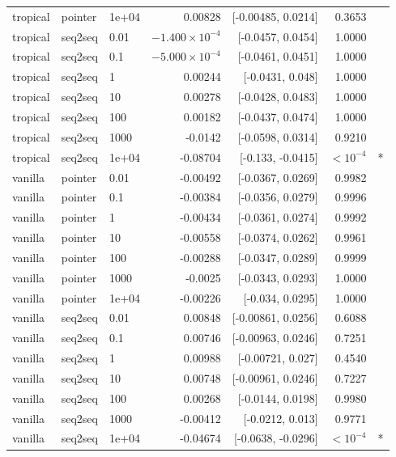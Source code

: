 \documentclass[10pt]{article}
\begin{document}
{\begin{longtable}{lllrrrl}
tropical & pointer & 1e+04 & 0.00828 & [-0.00485, 0.0214] & 0.3653 & \\
tropical & seq2seq & 0.01 & $-1.400\times10^{-4}$ & [-0.0457, 0.0454] & 1.0000 & \\
tropical & seq2seq & 0.1 & $-5.000\times10^{-4}$ & [-0.0461, 0.0451] & 1.0000 & \\
tropical & seq2seq & 1 & 0.00244 & [-0.0431, 0.048] & 1.0000 & \\
tropical & seq2seq & 10 & 0.00278 & [-0.0428, 0.0483] & 1.0000 & \\
tropical & seq2seq & 100 & 0.00182 & [-0.0437, 0.0474] & 1.0000 & \\
tropical & seq2seq & 1000 & -0.0142 & [-0.0598, 0.0314] & 0.9210 & \\
tropical & seq2seq & 1e+04 & -0.08704 & [-0.133, -0.0415] & $<10^{-4}$ & *\\
vanilla & pointer & 0.01 & -0.00492 & [-0.0367, 0.0269] & 0.9982 & \\
vanilla & pointer & 0.1 & -0.00384 & [-0.0356, 0.0279] & 0.9996 & \\
vanilla & pointer & 1 & -0.00434 & [-0.0361, 0.0274] & 0.9992 & \\
vanilla & pointer & 10 & -0.00558 & [-0.0374, 0.0262] & 0.9961 & \\
vanilla & pointer & 100 & -0.00288 & [-0.0347, 0.0289] & 0.9999 & \\
vanilla & pointer & 1000 & -0.0025 & [-0.0343, 0.0293] & 1.0000 & \\
vanilla & pointer & 1e+04 & -0.00226 & [-0.034, 0.0295] & 1.0000 & \\
vanilla & seq2seq & 0.01 & 0.00848 & [-0.00861, 0.0256] & 0.6088 & \\
vanilla & seq2seq & 0.1 & 0.00746 & [-0.00963, 0.0246] & 0.7251 & \\
vanilla & seq2seq & 1 & 0.00988 & [-0.00721, 0.027] & 0.4540 & \\
vanilla & seq2seq & 10 & 0.00748 & [-0.00961, 0.0246] & 0.7227 & \\
vanilla & seq2seq & 100 & 0.00268 & [-0.0144, 0.0198] & 0.9980 & \\
vanilla & seq2seq & 1000 & -0.00412 & [-0.0212, 0.013] & 0.9771 & \\
vanilla & seq2seq & 1e+04 & -0.04674 & [-0.0638, -0.0296] & $<10^{-4}$ & *\\
\bottomrule
\end{longtable}
}
\end{document}
